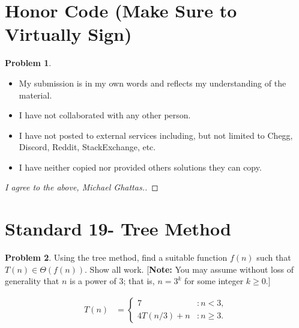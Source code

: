 \documentclass[11pt]{article}
\theoremstyle{definition}
\theoremstyle{definition}
\newtheorem{required}{Problem}
\theoremstyle{definition}
\begin{document}
\section{Honor Code (Make Sure to Virtually Sign)} \label{HonorCode}

\begin{required}
\noindent 
\begin{itemize}
\item My submission is in my own words and reflects my understanding of the material.
\item I have not collaborated with any other person.
\item I have not posted to external services including, but not limited to Chegg, Discord, Reddit, StackExchange, etc.
\item I have neither copied nor provided others solutions they can copy.
\end{itemize}

\end{required}

\begin{proof}[I agree to the above, Michael Ghattas.]
\end{proof}


\newpage
\section{Standard 19- Tree Method}
\begin{required}
Using the tree method, find a suitable function $f(n)$ such that $T(n) \in \Theta(f(n))$. Show all work. [\textbf{Note:} You may assume  without loss of generality that $n$ is a power of $3$; that is, $n = 3^{k}$ for some integer $k \geq 0$.]

\begin{align*}
T(n) &= \begin{cases} 
7 & : n < 3, \\
4T(n/3) + n & : n \geq 3.
\end{cases}
\end{align*}
\end{required}
\end{document}
